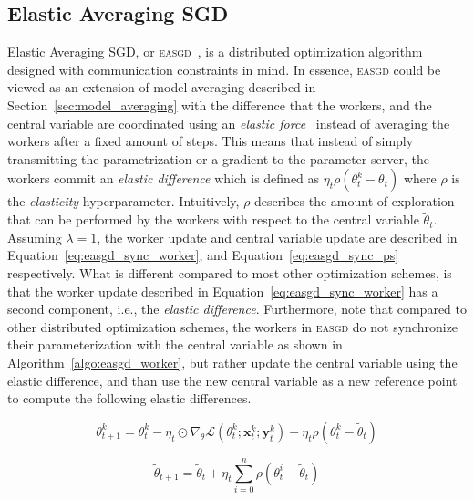 \subsection{Elastic Averaging SGD}
\label{sec:easgd}

Elastic Averaging SGD, or \textsc{easgd}~\cite{zhang2015deep}, is a distributed optimization algorithm designed with communication constraints in mind. In essence, \textsc{easgd} could be viewed as an extension of model averaging described in Section~\ref{sec:model_averaging} with the difference that the workers, and the central variable are coordinated using an \emph{elastic force}~\cite{zhang2015deep} instead of averaging the workers after a fixed amount of steps. This means that instead of simply transmitting the parametrization or a gradient to the parameter server, the workers commit an \emph{elastic difference} which is defined as $\eta_t \rho (\theta^k_t - \tilde{\theta}_t)$ where $\rho$ is the \emph{elasticity} hyperparameter. Intuitively, $\rho$ describes the amount of exploration that can be performed by the workers with respect to the central variable $\tilde{\theta}_t$.\\

Assuming $\lambda = 1$, the worker update and central variable update are described in Equation~\ref{eq:easgd_sync_worker}, and Equation~\ref{eq:easgd_sync_ps} respectively. What is different compared to most other optimization schemes, is that the worker update described in Equation~\ref{eq:easgd_sync_worker} has a second component, i.e., the \emph{elastic difference}. Furthermore, note that compared to other distributed optimization schemes, the workers in \textsc{easgd} do not synchronize their parameterization with the central variable as shown in Algorithm~\ref{algo:easgd_worker}, but rather update the central variable using the elastic difference, and than use the new central variable as a new reference point to compute the following elastic differences.

\begin{equation}
  \label{eq:easgd_sync_worker}
  \theta^k_{t + 1} = \theta^k_t - \eta_t \odot \nabla_\theta \mathcal{L}(\theta^k_t;\mathbf{x}^k_t;\mathbf{y}^k_t) - \eta_t\rho(\theta^k_t - \tilde{\theta}_t)
\end{equation}

\begin{equation}
  \label{eq:easgd_sync_ps}
  \tilde{\theta}_{t+1} = \tilde{\theta}_t + \eta_t \sum_{i=0}^n \rho(\theta^i_t - \tilde{\theta}_t)
\end{equation}

